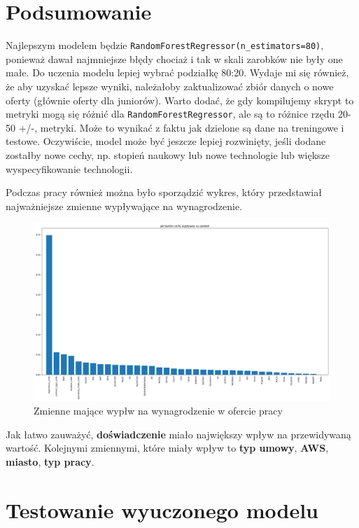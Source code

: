 \documentclass[a4paper]{article}
\begin{document}
\section{Podsumowanie}
\quad Najlepszym modelem będzie \texttt{RandomForestRegressor(n\_estimators=80)},
ponieważ dawał najmniejsze błędy chociaż i tak w skali zarobków nie były one małe.
Do uczenia modelu lepiej wybrać podziałkę 80:20. Wydaje mi się również, że aby uzyskać lepsze wyniki,
należałoby zaktualizować zbiór danych o nowe oferty (głównie oferty dla juniorów). Warto dodać, że
gdy kompilujemy skrypt to metryki mogą się różnić dla \texttt{RandomForestRegressor}, ale są to różnice rzędu 20-50 +/-, metryki. Może to wynikać z faktu jak dzielone są dane na treningowe i testowe.
Oczywiście, model może być jeszcze lepiej rozwinięty, jeśli dodane zostałby nowe cechy, np. stopień naukowy lub nowe technologie lub większe wyspecyfikowanie technologii.

\quad Podczas pracy również można było sporządzić wykres, który przedstawiał najważniejsze zmienne wypływające na wynagrodzenie.

\begin{figure}[H]
    \centering
    \includegraphics[width=\textwidth]{../analysis/plots/wyniki/importance_of_vars.png}
    \caption{Zmienne mające wypłw na wynagrodzenie w ofercie pracy}
\end{figure}

\quad Jak łatwo zauważyć, \textbf{doświadczenie} miało największy wpływ na przewidywaną wartość.
Kolejnymi zmiennymi, które miały wpływ to \textbf{typ umowy}, \textbf{AWS}, \textbf{miasto}, \textbf{typ pracy}.

\newpage

\section{Testowanie wyuczonego modelu}
\end{document}
